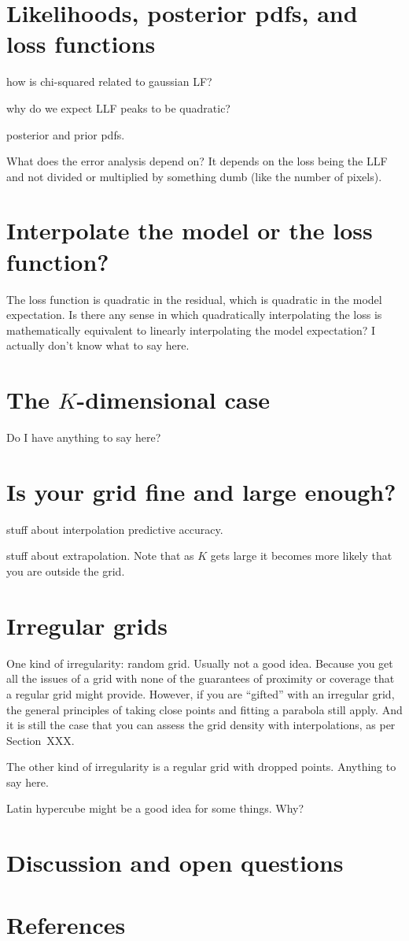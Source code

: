 \documentclass[12pt]{article}
\newcommand{\sectionname}{Section}
\begin{document}
\section{Likelihoods, posterior pdfs, and loss functions}

how is chi-squared related to gaussian LF?

why do we expect LLF peaks to be quadratic?

posterior and prior pdfs.

What does the error analysis depend on? It depends on the loss being
the LLF and not divided or multiplied by something dumb (like the
number of pixels).

\section{Interpolate the model or the loss function?}

The loss function is quadratic in the residual, which is quadratic in
the model expectation.
Is there any sense in which quadratically interpolating the loss is
mathematically equivalent to linearly interpolating the model
expectation?
I actually don't know what to say here. 

\section{The $K$-dimensional case}

Do I have anything to say here?

\section{Is your grid fine and large enough?}

stuff about interpolation predictive accuracy.

stuff about extrapolation. Note that as $K$ gets large it becomes
more likely that you are outside the grid.

\section{Irregular grids}

One kind of irregularity: random grid. Usually not a good idea.
Because you get all the issues of a grid with none of the guarantees
of proximity or coverage that a regular grid might provide.
However, if you are ``gifted'' with an irregular grid, the general
principles of taking close points and fitting a parabola still apply.
And it is still the case that you can assess the grid density with
interpolations, as per \sectionname~XXX.

The other kind of irregularity is a regular grid with dropped points.
Anything to say here.

Latin hypercube might be a good idea for some things. Why?

\section{Discussion and open questions}

\section{References}
\end{document}
